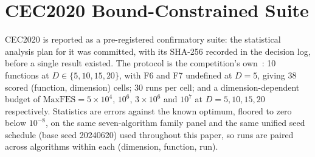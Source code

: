 %
%
%

\section{CEC2020 Bound-Constrained Suite}\label{sec:supp:cec2020}

\noindent CEC2020 is reported as a pre-registered confirmatory suite: the
statistical analysis plan for it was committed, with its SHA-256 recorded in
the decision log, before a single result existed.  The protocol is the
competition's own~\cite{yue2020cec2020}: 10 functions at
$D \in \{5, 10, 15, 20\}$, with F6 and F7 undefined at $D = 5$, giving 38
scored (function, dimension) cells; 30 runs per cell; and a
dimension-dependent budget of $\mathrm{MaxFES} = 5 \times 10^{4}$,
$10^{6}$, $3 \times 10^{6}$ and $10^{7}$ at $D = 5, 10, 15, 20$
respectively.  Statistics are errors against the known optimum, floored to
zero below $10^{-8}$, on the same seven-algorithm family panel and the same
unified seed schedule (base seed 20240620) used throughout this paper, so
runs are paired across algorithms within each (dimension, function, run).

